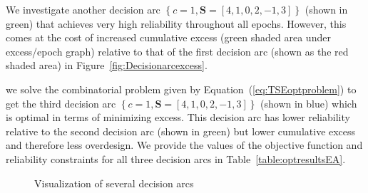 We investigate another decision arc $\left\{c=1,\mathbf{S}=\left[4,1,0,2,-1,3\right]\right\}$ (shown in green) that achieves very high reliability throughout all epochs. However, this comes at the cost of increased cumulative excess (green shaded area under excess/epoch graph) relative to that of the first decision arc (shown as the red shaded area) in Figure~\ref{fig:Decisionarcexcess}.

we solve the combinatorial problem given by Equation~(\ref{eq:TSEoptproblem}) to get the third decision arc $\left\{c=1,\mathbf{S}=\left[4,1,0,2,-1,3\right]\right\}$ (shown in blue) which is optimal in terms of minimizing excess. This decision arc has lower reliability relative to the second decision arc (shown in green) but lower cumulative excess and therefore less overdesign. We provide the values of the objective function and reliability constraints for all three decision arcs in Table~\ref{table:optresultsEA}.

\begin{figure}[h!]
	\centering
	 \hspace{0.1\textwidth}%
	 \hspace{0.1\textwidth}%
	\caption{Visualization of several decision arcs}
	\label{fig:epocheraexample}
\end{figure}

\newcommand{\ocwa}{0.75cm} %
\newcommand{\ocwb}{4cm} %
\newcommand{\ocwc}{1.5cm} %
\newcommand{\ocwd}{2cm} %
\newcommand{\ocwe}{3cm} %

